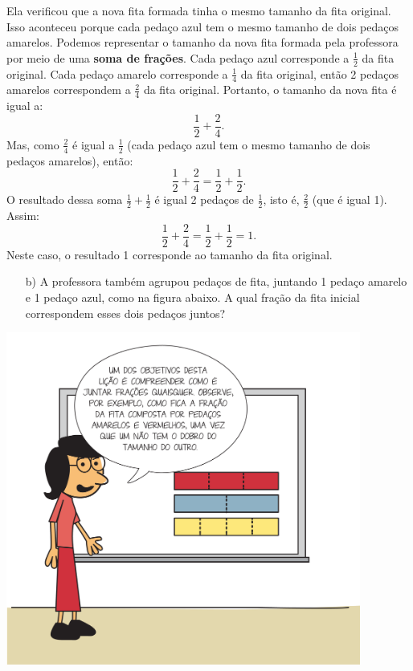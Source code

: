 \begin{atividade}[label=chap5-ativ2]{}
Ela verificou que a nova fita formada tinha o mesmo tamanho da fita original. Isso aconteceu porque cada pedaço azul tem o mesmo tamanho de dois pedaços amarelos. Podemos representar o tamanho da nova fita formada pela professora por meio de uma {\bf soma de frações}. Cada pedaço azul corresponde a $\frac{1}{2}$ da fita original. Cada pedaço amarelo corresponde a $\frac{1}{4}$ da fita original, então 2 pedaços amarelos correspondem a $\frac{2}{4}$ da fita original. Portanto, o tamanho da nova fita é igual a: $$\dfrac{1}{2} + \dfrac{2}{4}.$$ Mas, como $\frac{2}{4}$ é igual a $\frac{1}{2}$ (cada pedaço azul tem o mesmo tamanho de dois pedaços amarelos), então: $$\dfrac{1}{2} + \dfrac{2}{4} = \dfrac{1}{2} + \dfrac{1}{2}.$$ O resultado dessa soma $\frac{1}{2} + \frac{1}{2}$ é igual 2 pedaços de $\frac{1}{2}$, isto é, $\frac{2}{2}$ (que é igual 1). Assim: $$\dfrac{1}{2} + \dfrac{2}{4} = \dfrac{1}{2} + \dfrac{1}{2} = 1.$$ Neste caso, o resultado 1 corresponde ao tamanho da fita original.
 \begin{enumerate} [\quad a)] %
 \item[\quad b)]    A professora também agrupou pedaços de fita, juntando 1 pedaço amarelo e 1 pedaço azul, como na figura abaixo. A qual fração da fita inicial correspondem esses dois pedaços juntos?
\end{enumerate} %

\begin{center}
\includegraphics[width=330pt, keepaspectratio]{../figuras/licao05/ativ2_fig01.png}
\end{center}

\end{atividade}

